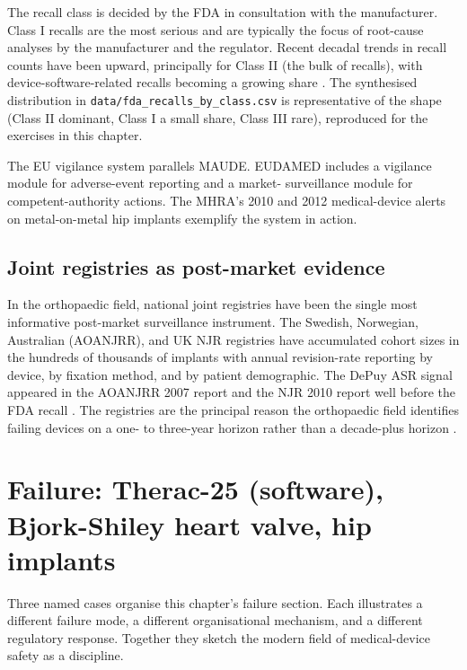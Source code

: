 The recall class is decided by the FDA in consultation with the
manufacturer. Class I recalls are the most serious and are
typically the focus of root-cause analyses by the manufacturer
and the regulator. Recent decadal trends in recall counts have
been upward, principally for Class II (the bulk of recalls), with
device-software-related recalls becoming a growing share
\cite{paper:v6c12-amato-recall-data-2014}. The synthesised
distribution in \texttt{data/fda\_recalls\_by\_class.csv} is
representative of the shape (Class II dominant, Class I a small
share, Class III rare), reproduced for the exercises in this
chapter.

The EU vigilance system parallels MAUDE. EUDAMED includes a
vigilance module for adverse-event reporting and a market-
surveillance module for competent-authority actions. The MHRA's
2010 and 2012 medical-device alerts on metal-on-metal hip implants
\cite{web:v6c12-mhra-mom-2012} exemplify the system in action.

\subsection{Joint registries as post-market evidence}

In the orthopaedic field, national joint registries have been the
single most informative post-market surveillance instrument. The
Swedish, Norwegian, Australian (AOANJRR), and UK NJR registries
have accumulated cohort sizes in the hundreds of thousands of
implants with annual revision-rate reporting by device, by
fixation method, and by patient demographic. The DePuy ASR signal
appeared in the AOANJRR 2007 report and the NJR 2010 report well
before the FDA recall \cite{web:v6c12-aoanjrr-2023,
web:v6c12-njr-2023, paper:v6c12-smith-asr-revision-2012}. The
registries are the principal reason the orthopaedic field
identifies failing devices on a one- to three-year horizon rather
than a decade-plus horizon
\cite{paper:v6c12-kessler-fdca-history-1996}.

\section{Failure: Therac-25 (software), Bjork-Shiley heart valve, hip implants}


Three named cases organise this chapter's failure section. Each
illustrates a different failure mode, a different organisational
mechanism, and a different regulatory response. Together they
sketch the modern field of medical-device safety as a discipline.

